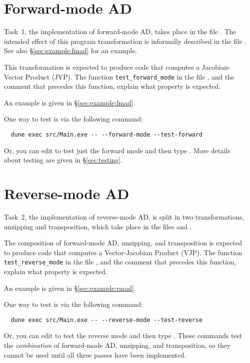 \documentclass{article}
\begin{document}

\section{Forward-mode AD}

Task~1, the implementation of forward-mode AD, takes place in the file
. The intended effect of this program transformation is
informally described in the file . See also
\S\ref{sec:example:fmad} for an example.

This transformation is expected to produce code that computes a
Jacobian-Vector Product (JVP). The function \texttt{test\_forward\_mode}
in the file , and the comment that precedes this function,
explain what property is expected.

An example is given in
\S\ref{sec:example:fmad}.

One way to test is via the following command:
\begin{verbatim}
  dune exec src/Main.exe -- --forward-mode --test-forward
\end{verbatim}
Or, you can edit  to test just the forward mode
and then type .
More details about testing are given in \S\ref{sec:testing}.


\section{Reverse-mode AD}

Task~2, the implementation of reverse-mode AD, is split in two
transformations, unzipping and transposition, which take place
in the files  and .

The composition of forward-mode AD, unzipping, and transposition is expected
to produce code that computes a Vector-Jacobian Product (VJP). The function
\texttt{test\_reverse\_mode} in the file , and the comment that
precedes this function, explain what property is expected.

An example is given in
\S\ref{sec:example:rmad}.

One way to test is via the following command:
\begin{verbatim}
  dune exec src/Main.exe -- --reverse-mode --test-reverse
\end{verbatim}
Or, you can edit  to test the reverse mode
and then type .
These commands test the \emph{combination} of forward-mode AD,
unzipping, and transposition, so they cannot be used until
all three passes have been implemented.
\end{document}
